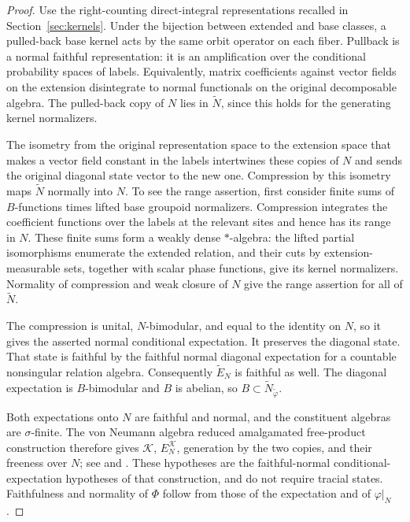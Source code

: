 \begin{proof}
Use the right-counting direct-integral representations recalled in
Section~\ref{sec:kernels}. Under the bijection between extended and base
classes, a pulled-back base kernel acts by the same orbit operator on
each fiber. Pullback is a normal faithful representation: it is an
amplification over the conditional probability spaces of labels.
Equivalently, matrix coefficients against vector fields on the extension
disintegrate to normal functionals on the original decomposable algebra.
The pulled-back copy of $N$ lies in $\widetilde N$, since this holds for
the generating kernel normalizers.

The isometry from the original representation space to the extension
space that makes a vector field constant in the labels intertwines these
copies of $N$ and sends the original diagonal state vector to the new
one. Compression by this isometry maps $\widetilde N$ normally into
$N$. To see the range assertion, first consider finite sums of
$B$-functions times lifted base groupoid normalizers. Compression
integrates the coefficient functions over the labels at the relevant
sites and hence has its range in $N$. These finite sums form a weakly
dense $*$-algebra: the lifted partial isomorphisms enumerate the extended
relation, and their cuts by extension-measurable sets, together with
scalar phase functions, give its kernel normalizers. Normality of
compression and weak closure of $N$ give the range assertion for all of
$\widetilde N$.

The compression is unital, $N$-bimodular, and equal to the identity on
$N$, so it gives the asserted normal conditional expectation. It
preserves the diagonal state. That state is faithful by the faithful
normal diagonal expectation for a countable nonsingular relation
algebra. Consequently $\widetilde E_N$ is faithful as well. The diagonal
expectation is $B$-bimodular and $B$ is abelian, so
$B\subset\widetilde N_{\widetilde\varphi}$.

Both expectations onto $N$ are faithful and normal, and the constituent
algebras are $\sigma$-finite. The von Neumann algebra reduced
amalgamated free-product construction therefore gives $\mathcal K$,
$E_N^{\mathcal K}$, generation by the two copies, and their freeness over
$N$; see \cite[Section~2]{Ued99} and \cite[Section~2]{Ued13}. These
hypotheses are the faithful-normal conditional-expectation hypotheses
of that construction, and do not require tracial states. Faithfulness
and normality of $\Phi$ follow from those of the expectation and of
$\varphi|_N$.


\end{proof}
